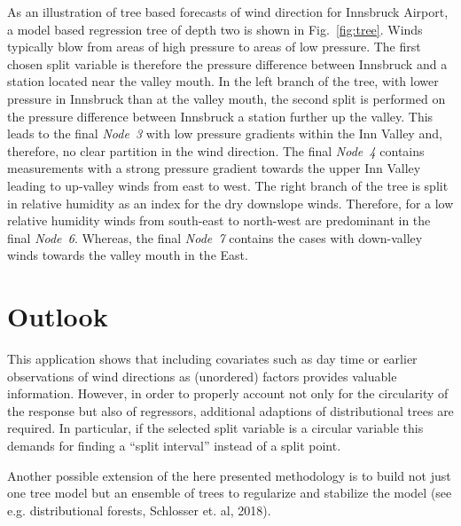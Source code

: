 \documentclass[twoside]{report}
\begin{document}
As an illustration of tree based forecasts of wind direction for Innsbruck Airport, a
model based regression tree of depth two is shown in Fig.~\ref{fig:tree}.
Winds typically blow from areas of high pressure to areas of low pressure. The
first chosen split variable is therefore the pressure difference between
Innsbruck and a station located near the valley mouth. In the left branch of
the tree, with lower pressure in Innsbruck than at the valley mouth, the second
split is performed on the pressure difference between Innsbruck a station
further up the valley. This leads to the final \emph{Node~3} with low pressure
gradients within the Inn Valley and, therefore, no clear partition in the wind
direction. The final \emph{Node~4} contains measurements with a strong pressure
gradient towards the upper Inn Valley leading to up-valley winds from east to
west. The right branch of the tree is split in relative humidity as an index
for the dry downslope winds. Therefore, for a low relative humidity winds from
south-east to north-west are predominant in the final \emph{Node~6}. Whereas,
the final \emph{Node~7} contains the cases with down-valley winds towards the
valley mouth in the East.

\section{Outlook}

This application shows that including covariates such as day time or earlier observations 
of wind directions as (unordered) factors provides valuable information. However, in order 
to properly account not only for the circularity of the response but also of regressors, 
additional adaptions of distributional trees are required. 
In particular, if the selected split variable is a circular variable this demands for 
finding a ``split interval'' instead of a split point.

Another possible extension of the here presented methodology is to build not just one tree 
model but an ensemble of trees to regularize and stabilize the model 
(see e.g. distributional forests, Schlosser et. al, 2018).
\end{document}
